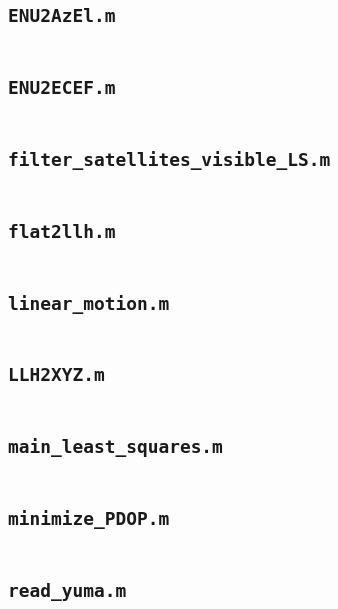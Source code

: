 \subsection{\texttt{ENU2AzEl.m}}
\inputminted[fontsize=\footnotesize]{matlab}{code_LS/ENU2AzEl.m}

\subsection{\texttt{ENU2ECEF.m}}
\inputminted[fontsize=\footnotesize]{matlab}{code_LS/ENU2ECEF.m}

\subsection{\texttt{filter\_satellites\_visible\_LS.m}}
\inputminted[fontsize=\footnotesize]{matlab}{code_LS/filter_satellites_visible_LS.m}

\subsection{\texttt{flat2llh.m}}
\inputminted[fontsize=\footnotesize]{matlab}{code_LS/flat2llh.m}

\subsection{\texttt{linear\_motion.m}}
\inputminted[fontsize=\footnotesize]{matlab}{code_LS/linear_motion.m}

\subsection{\texttt{LLH2XYZ.m}}
\inputminted[fontsize=\footnotesize]{matlab}{code_LS/LLH2XYZ.m}

\subsection{\texttt{main\_least\_squares.m}}
\inputminted[fontsize=\footnotesize]{matlab}{code_LS/main_least_squares.m}

\subsection{\texttt{minimize\_PDOP.m}}
\inputminted[fontsize=\footnotesize]{matlab}{code_LS/minimize_PDOP.m}

\subsection{\texttt{read\_yuma.m}}
\inputminted[fontsize=\footnotesize]{matlab}{code_LS/read_yuma.m}

